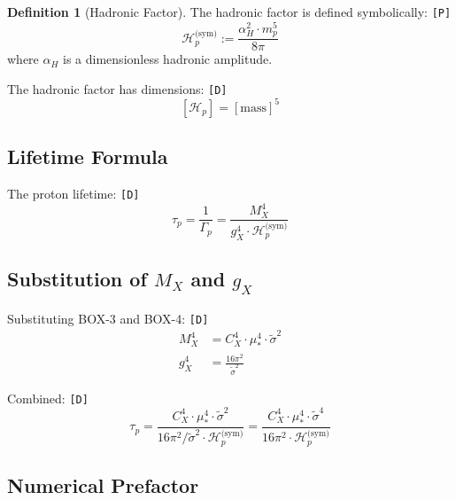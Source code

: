 \documentclass[11pt,a4paper]{article}
\newcommand{\tagD}{\textcolor{green!50!black}{\texttt{[D]}}}
\newcommand{\tagP}{\textcolor{orange!80!black}{\texttt{[P]}}}
\theoremstyle{definition}
\newtheorem{definition}{Definition}[section]
\begin{document}
\begin{definition}[Hadronic Factor]
\label{def:hadronic}
The hadronic factor is defined symbolically: \tagP{}
\begin{equation}
\label{eq:hadronic-def}
\mathcal{H}_p^{\text{(sym)}} := \frac{\alpha_H^2 \cdot m_p^5}{8\pi}
\end{equation}
where $\alpha_H$ is a dimensionless hadronic amplitude.
\end{definition}

The hadronic factor has dimensions: \tagD{}
\begin{equation}
\label{eq:hadronic-dim}
[\mathcal{H}_p] = [\text{mass}]^5
\end{equation}

\subsection{Lifetime Formula}
\label{subsec:lifetime-formula}

The proton lifetime: \tagD{}
\begin{equation}
\label{eq:lifetime-general}
\tau_p = \frac{1}{\Gamma_p} = \frac{M_X^4}{g_X^4 \cdot \mathcal{H}_p^{\text{(sym)}}}
\end{equation}

\subsection{Substitution of $M_X$ and $g_X$}
\label{subsec:substitution}

Substituting BOX-3 and BOX-4: \tagD{}
\begin{align}
\label{eq:sub-mx4}
M_X^4 &= C_X^4 \cdot \mu_*^4 \cdot \tilde{\sigma}^2 \\
\label{eq:sub-gx4}
g_X^4 &= \frac{16\pi^2}{\tilde{\sigma}^2}
\end{align}

Combined: \tagD{}
\begin{equation}
\label{eq:taup-combined}
\tau_p = \frac{C_X^4 \cdot \mu_*^4 \cdot \tilde{\sigma}^2}{16\pi^2 / \tilde{\sigma}^2 \cdot \mathcal{H}_p^{\text{(sym)}}}
= \frac{C_X^4 \cdot \mu_*^4 \cdot \tilde{\sigma}^4}{16\pi^2 \cdot \mathcal{H}_p^{\text{(sym)}}}
\end{equation}

\subsection{Numerical Prefactor}
\label{subsec:prefactor}
\end{document}
